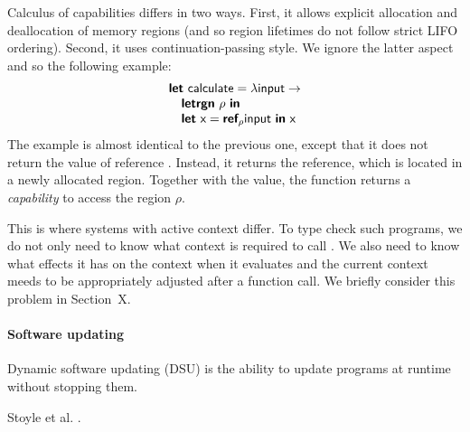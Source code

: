 Calculus of capabilities differs in two ways. First, it allows explicit allocation and deallocation
of memory regions (and so region lifetimes do not follow strict LIFO ordering). Second, it
uses continuation-passing style. We ignore the latter aspect and so the following example:
%
\begin{equation*}
\begin{array}{l}
\kvd{let}~\ident{calculate} = \lambda \ident{input} \rightarrow\\
\quad \kvd{letrgn}~\rho~\kvd{in}\\
\quad \kvd{let}~\ident{x} = \kvd{ref}_\rho \ident{input}~\kvd{in}~\ident{x}
\end{array}
\end{equation*}
%
The example is almost identical to the previous one, except that it does not return the value
of reference . Instead, it returns the reference, which is located in a newly allocated
region. Together with the value, the function returns a \emph{capability} to access the region
$\rho$.

This is where systems with active context differ. To type check such programs, we do not only need
to know what context is required to call . We also need to know what effects it
has on the context when it evaluates and the current context meeds to be appropriately adjusted
after a function call. We briefly consider this problem in Section~X. %


%
%


\paragraph{Software updating}
Dynamic software updating (DSU) is the ability to update programs at runtime without stopping them.

Stoyle et al. \cite{app-dsu-mutatis}.


